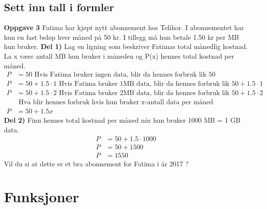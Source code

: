 \documentclass[12pt,twoside,onecolumn]{article}
\begin{document}
\subsection*{Sett inn tall i formler}
\textbf{Oppgave 3}
Fatima har kjøpt nytt abonnement hos Telihor. I abonnementet har hun en fast beløp hver måned på 50 kr. I tillegg må hun betale 1.50 kr per MB hun bruker. 
\newline\newline
\textbf{Del 1)} Lag en ligning som beskriver Fatimas total månedlig kostnad. La x være antall MB hun bruker i måneden og P(x) hennes total kostnad per måned.
\begin{align}
P &= 50 \text{ Hvis Fatima bruker ingen data, blir da hennes forbruk lik 50}\\ 
P &= 50 + 1.5\cdot1\text{ Hvis Fatima bruker 1MB data, blir da hennes forbruk lik $50 + 1.5\cdot1$}\\ 
P &= 50 + 1.5\cdot2\text{ Hvis Fatima bruker 2MB data, blir da hennes forbruk lik $50 + 1.5\cdot2$}\\ 
&\text{ Hva blir hennes forbruk hvis hun bruker x-antall data per måned} \nonumber\\
P &= 50 + 1.5x
\end{align}
\newline
\textbf{Del 2)}
Finn hennes total kostnad per måned når hun bruker 1000 MB = 1 GB data.
\begin{align}
P &= 50 + 1.5\cdot1000\\
P &= 50 + 1500\\
P &= 1550
\end{align}
Vil du si at dette er et bra abonnement for Fatima i år 2017 ?

\section*{Funksjoner}
\end{document}
